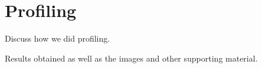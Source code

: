 \section{Profiling}

Discuss how we did profiling.

Results obtained as well as the images and other supporting material.